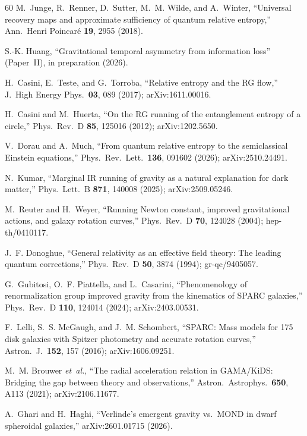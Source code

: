 \documentclass[prd,twocolumn,superscriptaddress,longbibliography,floatfix]{revtex4-2}
\begin{document}
\begin{thebibliography}{60}
M.~Junge, R.~Renner, D.~Sutter, M.~M. Wilde, and A.~Winter,
``Universal recovery maps and approximate sufficiency of
quantum relative entropy,''
Ann.\ Henri Poincar\'e \textbf{19}, 2955 (2018).

S.-K. Huang,
``Gravitational temporal asymmetry from information loss''
(Paper~II), in preparation (2026).

H.~Casini, E.~Teste, and G.~Torroba,
``Relative entropy and the RG flow,''
J.\ High Energy Phys.\ \textbf{03}, 089 (2017);
arXiv:1611.00016.

H.~Casini and M.~Huerta,
``On the RG running of the entanglement entropy of a circle,''
Phys.\ Rev.\ D \textbf{85}, 125016 (2012);
arXiv:1202.5650.

V.~Dorau and A.~Much,
``From quantum relative entropy to the semiclassical Einstein
equations,''
Phys.\ Rev.\ Lett.\ \textbf{136}, 091602 (2026);
arXiv:2510.24491.

N.~Kumar,
``Marginal IR running of gravity as a natural explanation
for dark matter,''
Phys.\ Lett.\ B \textbf{871}, 140008 (2025);
arXiv:2509.05246.

M.~Reuter and H.~Weyer,
``Running Newton constant, improved gravitational actions, and
galaxy rotation curves,''
Phys.\ Rev.\ D \textbf{70}, 124028 (2004);
hep-th/0410117.

J.~F. Donoghue,
``General relativity as an effective field theory: The leading
quantum corrections,''
Phys.\ Rev.\ D \textbf{50}, 3874 (1994);
gr-qc/9405057.

G.~Gubitosi, O.~F. Piattella, and L.~Casarini,
``Phenomenology of renormalization group improved gravity from
the kinematics of SPARC galaxies,''
Phys.\ Rev.\ D \textbf{110}, 124014 (2024);
arXiv:2403.00531.

F.~Lelli, S.~S. McGaugh, and J.~M. Schombert,
``SPARC: Mass models for 175 disk galaxies with Spitzer
photometry and accurate rotation curves,''
Astron.\ J.\ \textbf{152}, 157 (2016);
arXiv:1606.09251.

M.~M. Brouwer \emph{et~al.},
``The radial acceleration relation in GAMA/KiDS:
Bridging the gap between theory and observations,''
Astron.\ Astrophys.\ \textbf{650}, A113 (2021);
arXiv:2106.11677.

A.~Ghari and H.~Haghi,
``Verlinde's emergent gravity vs.\ MOND in dwarf spheroidal
galaxies,''
arXiv:2601.01715 (2026).


\end{thebibliography}
\end{document}

